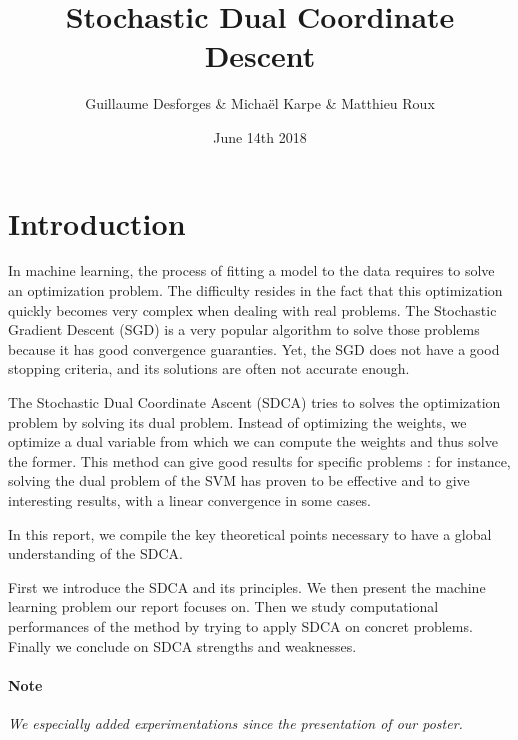\documentclass{article}
\title{Stochastic Dual Coordinate Descent}
\author{Guillaume Desforges \& Michaël Karpe \& Matthieu Roux}
\date{June 14th 2018}
\begin{document}
\maketitle

\section*{Introduction}

\hspace{2em}
In machine learning, the process of fitting a model to the data requires to solve an optimization problem.
The difficulty resides in the fact that this optimization quickly becomes very complex when dealing with real problems.
The Stochastic Gradient Descent (SGD) is a very popular algorithm to solve those problems because it has good convergence guaranties.
Yet, the SGD does not have a good stopping criteria, and its solutions are often not accurate enough.

\hspace{2em}
The Stochastic Dual Coordinate Ascent (SDCA) tries to solves the optimization problem by solving its dual problem.
Instead of optimizing the weights, we optimize a dual variable from which we can compute the weights and thus solve the former.
This method can give good results for specific problems : for instance, solving the dual problem of the SVM has proven to be effective and to give interesting results, with a linear convergence in some cases.

\hspace{2em}
In this report, we compile the key theoretical points necessary to have a global understanding of the SDCA.

\hspace{2em}
First we introduce the SDCA and its principles.
We then present the machine learning problem our report focuses on.
Then we study computational performances of the method by trying to apply SDCA on concret problems.
Finally we conclude on SDCA strengths and weaknesses.

\paragraph{Note} \textit{We especially added experimentations since the presentation of our poster.}
\end{document}
